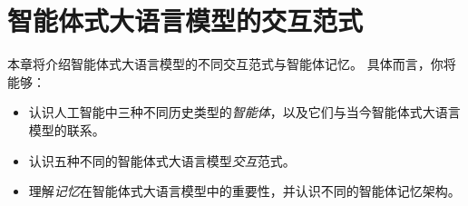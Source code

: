 

\chapter{智能体式大语言模型的交互范式}\label{chap:agents}



\begin{learningbox}
本章将介绍智能体式大语言模型的不同交互范式与智能体记忆。
具体而言，你将能够：
\begin{itemize}[leftmargin=*, nosep]
    \item 认识人工智能中三种不同历史类型的{\em 智能体}，以及它们与当今智能体式大语言模型的联系。  
    
    \item 认识五种不同的智能体式大语言模型{\em 交互}范式。 
    
    \item 理解{\em 记忆}在智能体式大语言模型中的重要性，并认识不同的智能体记忆架构。

\end{itemize}
\end{learningbox}

